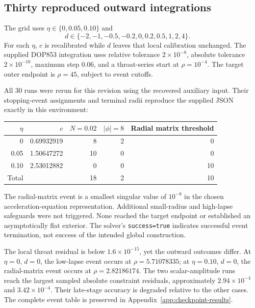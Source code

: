 \documentclass[11pt,oneside]{report}
\begin{document}
\subsection{Thirty reproduced outward integrations}
The grid uses $\eta\in\{0,0.05,0.10\}$ and
\begin{equation}
d\in\{-2,-1,-0.5,-0.2,0,0.2,0.5,1,2,4\}.
\end{equation}
For each $\eta$, $c$ is recalibrated while $d$ leaves that local calibration unchanged. The supplied DOP853 integration uses relative tolerance $2\times10^{-8}$, absolute tolerance $2\times10^{-10}$, maximum step $0.06$, and a throat-series start at $\rho=10^{-4}$. The target outer endpoint is $\rho=45$, subject to event cutoffs.

All 30 runs were rerun for this revision using the recovered auxiliary input. Their stopping-event assignments and terminal radii reproduce the supplied JSON exactly in this environment:
\begin{center}\begin{tabular}{rrrrr}\toprule
$\eta$ & $c$ & $N=0.02$ & $|\phi|=8$ & Radial matrix threshold\\\midrule
0 & 0.69932919 & 8 & 2 & 0\\
0.05 & 1.50647272 & 10 & 0 & 0\\
0.10 & 2.53012882 & 0 & 0 & 10\\\midrule
Total & & 18 & 2 & 10\\\bottomrule
\end{tabular}\end{center}
The radial-matrix event is a smallest singular value of $10^{-8}$ in the chosen acceleration-equation representation. Additional small-radius and high-lapse safeguards were not triggered. None reached the target endpoint or established an asymptotically flat exterior. The solver's \texttt{success=true} indicates successful event termination, not success of the intended global construction.

The local throat residual is below $1.6\times10^{-15}$, yet the outward outcomes differ. At $\eta=0$, $d=0$, the low-lapse event occurs at $\rho=5.71078335$; at $\eta=0.10$, $d=0$, the radial-matrix event occurs at $\rho=2.82186174$. The two scalar-amplitude runs reach the largest sampled absolute constraint residuals, approximately $2.94\times10^{-4}$ and $3.42\times10^{-4}$. Their late-stage accuracy is degraded relative to the other cases. The complete event table is preserved in Appendix~\ref{app:checkpoint-results}.
\end{document}
